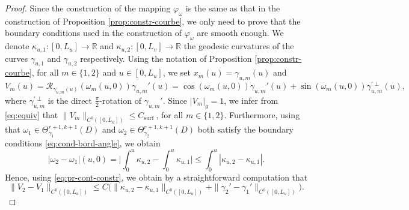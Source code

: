 \documentclass{article}
\newcommand{\RR}{\mathcal{R}}
\newcommand{\Csurf}{C_{\text{surf }}}
\newcommand{\R}{\mathbb{R}}
\newcommand{\ko}{\kappa}
\theoremstyle{remark}
\theoremstyle{prpart}
\begin{document}
\begin{proof}
  Since the construction of the mapping $\varphi_\omega$ is the same as that in the construction of Proposition \ref{prop:constr-courbe}, we only need to prove that the boundary conditions used in the construction of $\varphi_\omega$ are smooth enough. %
  We denote $\ko_{u,1}:[0,L_u]\to\R$ and $\ko_{u,2}:[0,L_v]\to\R$ the geodesic curvatures of the curves $\gamma_{u,1}$ and $\gamma_{u,2}$ respectively.
  Using the notation of Proposition \ref{prop:constr-courbe}, for all $m\in\{1,2\}$ and $u\in[0,L_u]$, we set $x_m(u) = \gamma_{u,m}(u)$ and 
  \begin{equation}\label{eq:pr-cont-constr}
    V_m(u) = \RR_{\gamma_{u,m}(u)}(\omega_m(u,0))\gamma_{u,m}'(u) = \cos(\omega_m(u,0))\gamma_{u,m}'(u) + \sin(\omega_m(u,0))\gamma_{u,m}^{\prime\perp}(u),
  \end{equation}
 where $\gamma_{u,m}^{\prime\perp}$ is the direct $\frac{\pi}{2}$-rotation of $\gamma_{u,m}'$.  %
 Since $|V_m|_g=1$, we infer from \eqref{eq:equiv} that $\|V_m\|_{C^0([0,L_u])}\leq \Csurf$, for all $m\in\{1,2\}$. Furthermore, using that $\omega_1\in\Theta^{r+1,k+1}_{\gamma_1}(D)$ and  $\omega_2\in \Theta^{r+1,k+1}_{\gamma_2}(D)$ both satisfy the boundary conditions \eqref{eq:cond-bord-angle}, we obtain
 \begin{equation*}
   |\omega_2-\omega_1|(u,0) = \Big|\int_0^u\ko_{u,2}-\int_0^u\ko_{u,1}\Big| \leq \int_0^u|\ko_{u,2}-\ko_{u,1}|.
 \end{equation*}
 Hence, using \eqref{eq:pr-cont-constr}, we obtain by a straightforward computation that
 \begin{equation}\label{eq:pr-cont-constr2}
   \|V_2-V_1\|_{C^0([0,L_u])} \leq C\Big( \|\ko_{u,2}-\ko_{u,1}\|_{C^0([0,L_u])} + \|\gamma_2'-\gamma_1'\|_{C^0([0,L_u])}\Big).

\end{equation}
\end{proof}
\end{document}
